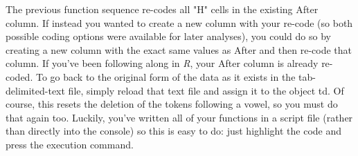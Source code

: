 \documentclass[
  12pt,
  letterpaper]{article}
\renewcommand\texttt[1]{{\ttfamily\color{BrickRed}#1}}
\begin{document}
The previous function sequence re-codes all \texttt{"H"} cells in the
existing \texttt{After} column. If instead you wanted to create a new
column with your re-code (so both possible coding options were available
for later analyses), you could do so by creating a new column with the
exact same values as \texttt{After} and then re-code that column. If
you've been following along in \emph{R}, your \texttt{After} column is
already re-coded. To go back to the original form of the data as it
exists in the tab-delimited-text file, simply reload that text file and
assign it to the object \texttt{td}. Of course, this resets the deletion
of the tokens following a vowel, so you must do that again too. Luckily,
you've written all of your functions in a script file (rather than
directly into the console) so this is easy to do: just highlight the
code and press the execution command.
\end{document}
